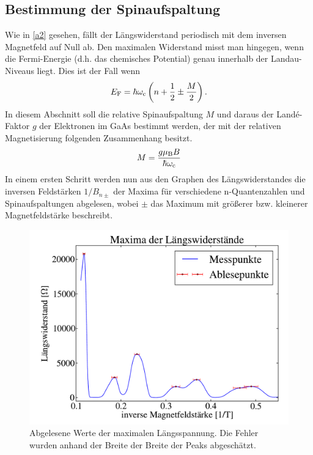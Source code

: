 \documentclass[paper=a4,fontsize=10pt,DIV=18,twocolumn,parskip=half]{scrartcl}
\numberwithin{equation}{section}    %
\begin{document}
\subsection{Bestimmung der Spinaufspaltung}
\label{a6}
Wie in \ref{a2} gesehen, fällt der Längswiderstand periodisch mit dem inversen Magnetfeld auf Null ab. Den maximalen Widerstand misst man hingegen, wenn die Fermi-Energie (d.h. das chemisches Potential) genau innerhalb der Landau-Niveaus liegt. Dies ist der Fall wenn
\begin{equation}
E_{\rm F}=\hbar \omega_{\rm c}\left( n+\frac{1}{2}\pm\frac{M}{2}\right).
\end{equation}
In diesem Abschnitt soll die relative Spinaufspaltung $M$ und daraus der Landé-Faktor $g$ der Elektronen im GaAs bestimmt werden, der mit der relativen Magnetisierung folgenden Zusammenhang besitzt.
\begin{equation}
M=\frac{g \mu_{\rm B} B}{\hbar \omega_{\rm c}}
\label{lande}
\end{equation}
In einem ersten Schritt werden nun aus den Graphen des Längswiderstandes die inversen Feldstärken $1/B_{n\pm}$ der Maxima für verschiedene n-Quantenzahlen und Spinaufspaltungen abgelesen, wobei $\pm$ das Maximum mit größerer bzw. kleinerer Magnetfeldstärke beschreibt.

\begin{figure}[]
	\begin{center}
		\includegraphics[width=\columnwidth]{Data-Plots/07-maxima_ablesen.pdf}
		\caption{Abgelesene Werte der maximalen Längsspannung. Die Fehler wurden anhand der Breite der Breite der Peaks abgeschätzt.}
		\label{maxima}
	\end{center}
\end{figure}
\end{document}
